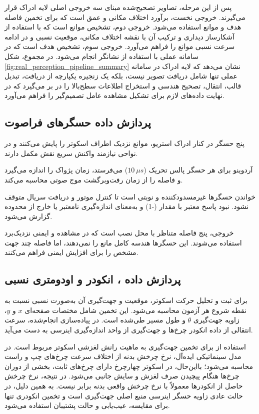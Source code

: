 پس از این مرحله، تصاویر تصحیح‌شده مبنای سه خروجی اصلی لایه ادراک قرار می‌گیرند. خروجی نخست، برآورد اختلاف مکانی و عمق است که برای تخمین فاصله هدف و موانع استفاده می‌شود. خروجی دوم، تشخیص موانع است که با استفاده از آشکارساز دیداری و ترکیب آن با نقشه اختلاف مکانی، موقعیت نسبی و در ادامه سرعت نسبی موانع را فراهم می‌آورد. خروجی سوم، تشخیص هدف است که در سامانه عملی با استفاده از نشانگر  انجام می‌شود. در مجموع، شکل \ref{fig:real_perception_pipeline_summary} نشان می‌دهد که لایه ادراک در سامانه عملی تنها شامل دریافت تصویر نیست، بلکه یک زنجیره یکپارچه از دریافت، تبدیل قالب، انتقال، تصحیح هندسی و استخراج اطلاعات سطح‌بالا را در بر می‌گیرد که در نهایت داده‌های لازم برای تشکیل مشاهده عامل تصمیم‌گیر را فراهم می‌آورد.

\subsection{پردازش داده حسگرهای فراصوت}
\label{subsec:real_ultrasonic_processing}

پنج حسگر  در کنار ادراک استریو، موانع نزدیک اطراف اسکوتر را پایش می‌کنند و در نواحی نیازمند واکنش سریع نقش مکمل دارند.

آردوینو برای هر حسگر پالس تحریک ($10~\mu s$) می‌فرستد، زمان پژواک را اندازه می‌گیرد و فاصله را از زمان رفت‌وبرگشت موج صوتی محاسبه می‌کند.

خواندن حسگرها غیرمسدودکننده و نوبتی است تا کنترل موتور و دریافت سریال متوقف نشود. نبود پاسخ معتبر با مقدار (-1) و به‌معنای اندازه‌گیری نامعتبر یا خارج از محدوده گزارش می‌شود.

خروجی، پنج فاصله متناظر با محل نصب است که در مشاهده و ایمنی نزدیک‌برد استفاده می‌شوند. این حسگرها هندسه کامل مانع را نمی‌دهند، اما فاصله چند جهت مشخص را برای افزایش ایمنی فراهم می‌کنند.

\subsection{پردازش داده ، انکودر و اودومتری نسبی}
\label{subsec:real_imu_encoder_odometry_processing}

برای ثبت و تحلیل حرکت اسکوتر، موقعیت و جهت‌گیری آن به‌صورت نسبی نسبت به نقطه شروع هر آزمون محاسبه می‌شود. این تخمین شامل مختصات صفحه‌ای $x$ و $y$، زاویه جهت‌گیری $\theta$ و طول مسیر طی‌شده است. در پیاده‌سازی انجام‌شده، سرعت انتقالی از داده انکودر چرخ‌ها و جهت‌گیری از واحد اندازه‌گیری اینرسی به دست می‌آید.

استفاده از  برای تخمین جهت‌گیری به ماهیت رانش لغزشی اسکوتر مربوط است. در مدل سینماتیکی ایده‌آل، نرخ چرخش بدنه از اختلاف سرعت چرخ‌های چپ و راست محاسبه می‌شود؛ بااین‌حال، در اسکوتر چهارچرخ دارای چرخ‌های ثابت، بخشی از دوران چرخ‌ها هنگام پیچیدن صرف لغزش و سایش جانبی می‌شود. در نتیجه، نرخ چرخش حاصل از انکودرها معمولاً با نرخ چرخش واقعی بدنه برابر نیست. به همین دلیل، در حالت عادی زاویه  حسگر اینرسی منبع اصلی جهت‌گیری است و تخمین انکودری تنها برای مقایسه، عیب‌یابی و حالت پشتیبان استفاده می‌شود.

